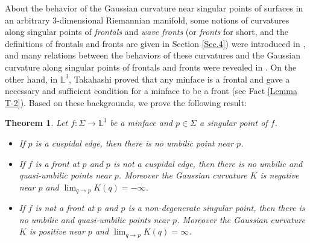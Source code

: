\documentclass[11pt,reqno]{amsart}
\theoremstyle{plain} %
\newtheorem{theor}{Theorem}
\theoremstyle{definition}
\begin{document}
About the behavior of the Gaussian curvature near singular points of surfaces in an arbitrary 3-dimensional Riemannian manifold, some notions of curvatures along singular points of {\it frontals} and {\it wave fronts} (or {\it fronts} for short, and the definitions of frontals and fronts are given in Section \ref{Sec.4}) were introduced in \cite{MSUY, SUY09}, and many relations between the behaviors of these curvatures and the Gaussian curvature along singular points of frontals and fronts were revealed in \cite{FSUY, MSUY, SUY09}. On the other hand, in $\mathbb{L}^3$, Takahashi \cite{T} proved that any minface is a frontal and gave a necessary and sufficient condition for a minface to be a front (see Fact \ref{Lemma T-2}). Based on these backgrounds, we prove the following result:%
\begin{theor}\label{Maintheorem}
Let $f: \Sigma \longrightarrow \mathbb{L}^3$ be a minface and $p\in \Sigma$ a singular point of $f$. 
\begin{itemize}
\item[(i)] If $p$ is a cuspidal edge, then there is no umbilic point near $p$.
\item[(ii)] If $f$ is a front at $p$ and $p$ is not a cuspidal edge, then there is no umbilic and quasi-umbilic points near $p$. Moreover the Gaussian curvature $K$ is negative near $p$ and $\displaystyle \lim_{q \to p} K(q)=-\infty$.
\item[(iii)] If $f$ is not a front at $p$ and $p$ is a non-degenerate singular point, then there is no umbilic and quasi-umbilic points near $p$. Moreover the Gaussian curvature $K$ is positive near $p$ and $\displaystyle \lim_{q \to p} K(q)=\infty$.
\end{itemize}
\end{theor}
\end{document}
